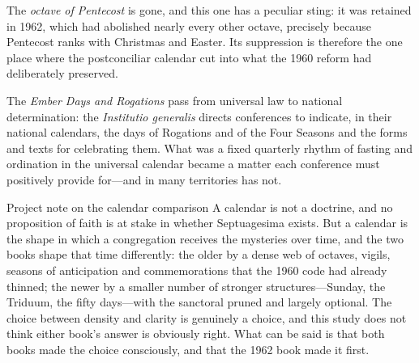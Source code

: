The \emph{octave of Pentecost} is gone, and this one has a peculiar sting: it was retained in 1962, which had abolished nearly every other octave, precisely because Pentecost ranks with Christmas and Easter. Its suppression is therefore the one place where the postconciliar calendar cut into what the 1960 reform had deliberately preserved.

The \emph{Ember Days and Rogations} pass from universal law to national determination: the \emph{Institutio generalis} directs conferences to indicate, in their national calendars, the days of Rogations and of the Four Seasons and the forms and texts for celebrating them. What was a fixed quarterly rhythm of fasting and ordination in the universal calendar became a matter each conference must positively provide for---and in many territories has not.

\begin{studybox}{Project note on the calendar comparison}
A calendar is not a doctrine, and no proposition of faith is at stake in whether Septuagesima exists. But a calendar is the shape in which a congregation receives the mysteries over time, and the two books shape that time differently: the older by a dense web of octaves, vigils, seasons of anticipation and commemorations that the 1960 code had already thinned; the newer by a smaller number of stronger structures---Sunday, the Triduum, the fifty days---with the sanctoral pruned and largely optional. The choice between density and clarity is genuinely a choice, and this study does not think either book's answer is obviously right. What can be said is that both books made the choice consciously, and that the 1962 book made it first.
\end{studybox}
